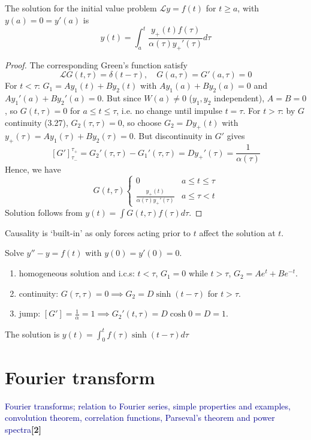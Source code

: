 \documentclass[a4paper]{article}
\begin{document}
\begin{prop}
The solution for the initial value problem $\mathcal{L}y=f(t)$ for $t\geq a$, with $y(a)=0=y'(a)$ is
\begin{equation}
    y(t)=\int_a^t\frac{y_+(t)f(\tau)}{\alpha(\tau)y_+'(\tau)}d\tau\tag{3.19}
\end{equation}
\end{prop}
\begin{proof}
The corresponding Green's function satisfy
$$\mathcal{L}G(t,\tau)=\delta(t-\tau), \quad G(a,\tau)=G'(a,\tau)=0$$
For $t<\tau$: $G_1=Ay_1(t)+By_2(t)$ with $Ay_1(a)+By_2(a)=0$ and $Ay_1'(a)+By_2'(a)=0$. But since $W(a)\neq 0$ ($y_1,y_2$ independent), $A=B=0$, so $G(t,\tau)=0$ for $a\leq t\leq\tau$, i.e. no change until impulse $t=\tau$. For $t>\tau$: by $G$ continuity (3.27), $G_2(\tau,\tau)=0$, so choose $G_2=Dy_+(t)$ with $y_+(\tau)=Ay_1(\tau)+By_2(\tau)=0$. But discontinuity in $G'$ gives
$$[G']_{\tau_-}^{\tau_+}=G_2'(\tau,\tau)-G_1'(\tau,\tau)=Dy_+'(\tau)=\frac{1}{\alpha(\tau)}$$
Hence, we have
\begin{equation}
   G(t,\tau)
\left\{
        \begin{array}{ll}
      0 & a\leq t\leq\tau\\
      \frac{y_+(t)}{\alpha(\tau)y_+'(\tau)} & a\leq\tau<t
        \end{array}
    \right.\tag{3.20} 
\end{equation}
Solution follows from $y(t)=\int G(t,\tau)f(\tau)d\tau$.
\end{proof}
\begin{remarks}
Causality is `built-in' as only forces acting prior to $t$ affect the solution at $t$.
\end{remarks}
\begin{eg}
Solve $y''-y=f(t)$ with $y(0)=y'(0)=0$.
\begin{enumerate}
    \item homogeneous solution and i.c.s: $t<\tau$, $G_1=0$ while $t>\tau$, $G_2=Ae^t+Be^{-t}$.
    \item continuity: $G(\tau,\tau)=0\implies G_2=D\sinh(t-\tau)$ for $t>\tau$.
    \item jump: $[G']=\frac{1}{\alpha}=1\implies G_2'(t,\tau)=D\cosh 0=D=1$.
\end{enumerate}
The solution is $y(t)=\int_0^tf(\tau)\sinh(t-\tau)d\tau$
\end{eg}
\newpage
\section{Fourier transform}
{\small\textcolor{darkblue}{Fourier transforms; relation to Fourier series, simple properties and examples, convolution theorem, correlation functions, Parseval's theorem and power spectra}\hfill\textbf{[2]}}
\end{document}

